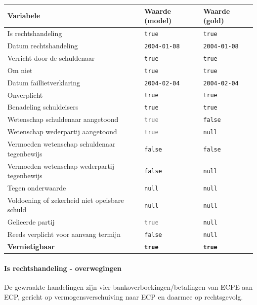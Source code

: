 \documentclass[
  dutch,
  a4paper,
]{article}
\begin{document}
\begin{center}
\small
\begin{tabular}{@{}p{7.4cm}p{2.6cm}p{2.6cm}@{}}
\toprule
Variabele & Waarde (model) & Waarde (gold) \\
\midrule
Is rechtshandeling & \texttt{true} & \texttt{true} \\
Datum rechtshandeling & \texttt{2004-01-08} & \texttt{2004-01-08} \\
Verricht door de schuldenaar & \texttt{true} & \texttt{true} \\
Om niet & \texttt{true} & \texttt{true} \\
Datum faillietverklaring & \texttt{2004-02-04} & \texttt{2004-02-04} \\
Onverplicht & \texttt{true} & \texttt{true} \\
Benadeling schuldeisers & \texttt{true} & \texttt{true} \\
Wetenschap schuldenaar aangetoond & \textcolor{gray}{\texttt{true}} & \texttt{false} \\
Wetenschap wederpartij aangetoond & \textcolor{gray}{\texttt{true}} & \texttt{null} \\
Vermoeden wetenschap schuldenaar tegenbewijs & \texttt{false} & \texttt{false} \\
Vermoeden wetenschap wederpartij tegenbewijs & \texttt{false} & \texttt{null} \\
Tegen onderwaarde & \texttt{null} & \texttt{null} \\
Voldoening of zekerheid niet opeisbare schuld & \texttt{null} & \texttt{null} \\
Gelieerde partij & \textcolor{gray}{\texttt{true}} & \texttt{null} \\
Reeds verplicht voor aanvang termijn & \texttt{false} & \texttt{null} \\
\textbf{Vernietigbaar} & \textbf{\texttt{true}} & \textbf{\texttt{true}} \\
\bottomrule
\end{tabular}
\end{center}

\paragraph{Is rechtshandeling - overwegingen}\label{is-rechtshandeling---overwegingen-49}

De gewraakte handelingen zijn vier bankoverboekingen/betalingen van ECPE aan ECP, gericht op vermogensverschuiving naar ECP en daarmee op rechtsgevolg.
\end{document}
